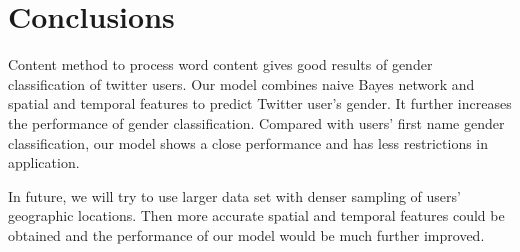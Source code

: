 \documentclass{article}
\begin{document}
\section{Conclusions}

Content method to process word content gives good results of gender classification of twitter users. Our model combines naive Bayes network and spatial and temporal features to predict Twitter user's gender. It further increases the performance of gender classification. Compared with users' first name gender classification, our model shows a close performance and has less restrictions in application.

In future, we will try to use larger data set with denser sampling of users' geographic locations. Then more accurate spatial and temporal features could be obtained and the performance of our model would be much further improved. 
\end{document}
